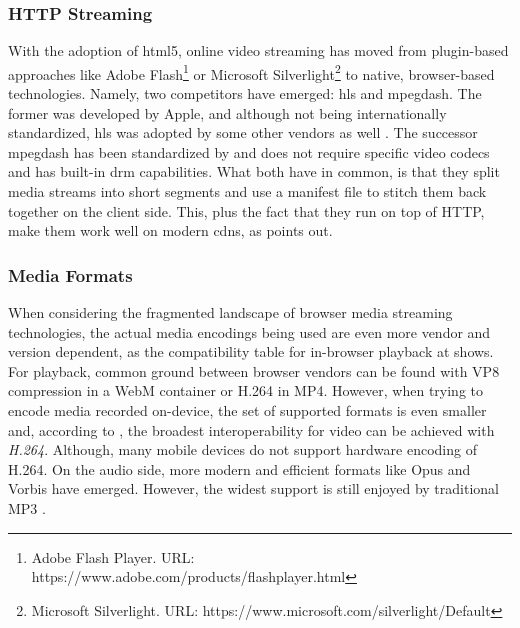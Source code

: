 \subsubsection{HTTP Streaming}
\label{sec:http-streaming}

With the adoption of \gls{html}5, online video streaming has moved from plugin-based approaches like Adobe Flash\footnote{\label{adobe-flash}Adobe Flash Player. URL: {https://www.adobe.com/products/flashplayer.html}} or Microsoft Silverlight\footnote{\label{silverlight}Microsoft Silverlight. URL: {https://www.microsoft.com/silverlight/Default}} to native, browser-based technologies. Namely, two competitors have emerged: \gls{hls} and \gls{mpegdash}. The former was developed by Apple, and although not being internationally standardized, \gls{hls} was adopted by some other vendors as well \cite{caniuse-hls}. The successor \gls{mpegdash} has been standardized by \citet{iso-mpeg-dash} and does not require specific video codecs and has built-in \gls{drm} capabilities. What both have in common, is that they split media streams into short segments and use a manifest file to stitch them back together on the client side. This, plus the fact that they run on top of HTTP, make them work well on modern \glspl{cdn}, as \cite{hls-vs-dash} points out.

\subsubsection{Media Formats}

When considering the fragmented landscape of browser media streaming technologies, the actual media encodings being used are even more vendor and version dependent, as the compatibility table for in-browser playback at \cite{media-format-browser-compat} shows. For playback, common ground between browser vendors can be found with VP8 compression in a WebM container or H.264 in MP4. However, when trying to encode media recorded on-device, the set of supported formats is even smaller and, according to \citet[\S5.1]{webrtc-hacks-safari}, the broadest interoperability for video can be achieved with \textit{H.264}. Although, many mobile devices do not support hardware encoding of H.264. On the audio side, more modern and efficient formats like Opus and Vorbis have emerged. However, the widest support is still enjoyed by traditional MP3 \cite{media-format-browser-compat}.
